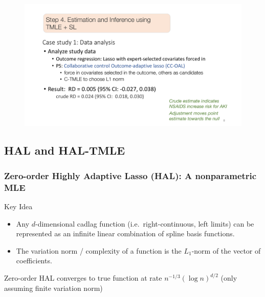 \documentclass[t]{beamer}
\begin{document}
\begin{frame}
\centering
\begin{figure}
\begin{center}
\includegraphics[width=1.02\textwidth]{figures/abbviepdfslides_8.pdf}
\end{center}
\end{figure}
\end{frame}

\subsection{HAL and HAL-TMLE}

\begin{frame}
\frametitle{Zero-order Highly Adaptive Lasso (HAL): A nonparametric MLE}
\begin{block}{\large{Key Idea}}
\begin{itemize}
\vspace{.1in}
\item Any $d$-dimensional cadlag function (i.e.~right-continuous, left limits)
can be represented as an infinite linear combination of spline basis functions.
\vspace{.05in}
\item The variation norm / complexity of a function is the $L_1$-norm of the vector of coefficients.
\vspace{.1in}
\end{itemize}
\end{block}
\vspace{0.25in}
\begin{center}
{\large Zero-order HAL converges to true function at rate $n^{-1/3}(\log n)^{d/2}$ (only assuming finite variation norm)}
\end{center}
\end{frame}
\end{document}
